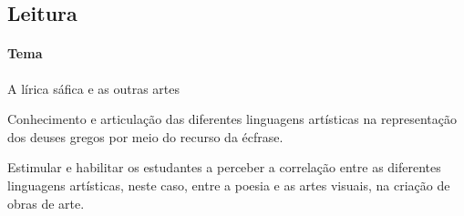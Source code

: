 \documentclass[12pt]{extarticle}
\begin{document}
\subsection{Leitura}









\paragraph{Tema} A lírica sáfica e as outras artes

 Conhecimento e articulação das diferentes linguagens
artísticas na representação dos deuses gregos por meio do recurso da écfrase.

 Estimular e habilitar os estudantes a perceber a 
correlação entre as diferentes linguagens artísticas, neste caso, entre a 
poesia e as artes visuais, na criação de obras de arte. 
\end{document}
